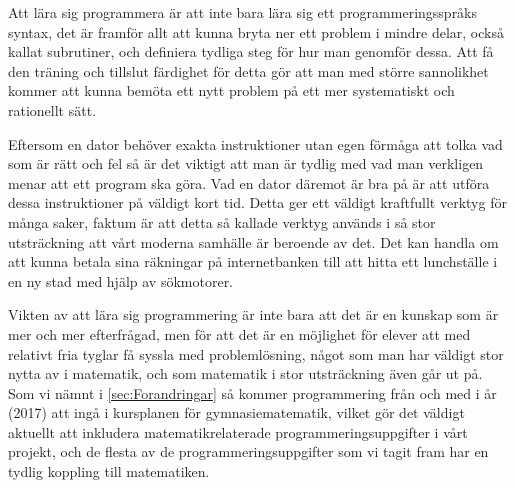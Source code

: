 \textcolor{Mahogany}{Att lära sig programmera är att inte bara lära sig ett programmeringsspråks syntax, det är framför allt att kunna bryta ner ett problem i mindre delar, också kallat subrutiner, och definiera tydliga steg för hur man genomför dessa. Att få den träning och tillslut färdighet för detta gör att man med större sannolikhet kommer att kunna bemöta ett nytt problem på ett mer systematiskt och rationellt sätt.}

\textcolor{Mahogany}{Eftersom en dator behöver exakta instruktioner utan egen förmåga att tolka vad som är rätt och fel så är det viktigt att man är tydlig med vad man verkligen menar att ett program ska göra. Vad en dator däremot är bra på är att utföra dessa instruktioner på väldigt kort tid. Detta ger ett väldigt kraftfullt verktyg för många saker, faktum är att detta så kallade verktyg används i så stor utsträckning att vårt moderna samhälle är beroende av det. Det kan handla om att kunna betala sina räkningar på internetbanken till att hitta ett lunchställe i en ny stad med hjälp av sökmotorer.}

\textcolor{Mahogany}{Vikten av att lära sig programmering är inte bara att det är en kunskap som är mer och mer efterfrågad, men för att det är en möjlighet för elever att med relativt fria tyglar få syssla med problemlösning, något som man har väldigt stor nytta av i matematik\cite{TheElephant}, och som matematik i stor utsträckning även går ut på. Som vi nämnt i \ref{sec:Forandringar} så kommer programmering från och med i år (2017) att ingå i kursplanen för gymnasiematematik, vilket gör det väldigt aktuellt att inkludera matematikrelaterade programmeringsuppgifter i vårt projekt, och de flesta av de programmeringsuppgifter som vi tagit fram har en tydlig koppling till matematiken.}